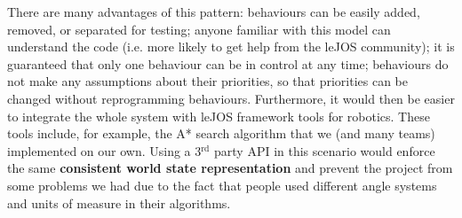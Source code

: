 There are many advantages of this pattern: behaviours can be easily added, removed, or 
separated for testing; anyone familiar with this model can understand the code (i.e. more 
likely to get help from the leJOS community); it is guaranteed that only one behaviour can be 
in control at any time; behaviours do not make any assumptions about their priorities, so that 
priorities can be changed without reprogramming behaviours. Furthermore, it would then be 
easier to integrate the whole system with leJOS framework tools for robotics. These tools 
include, for example, the A* search algorithm that we (and many teams) implemented on our own. 
Using a 3$^{\textrm{rd}}$ party API in this scenario would enforce the same \textbf{consistent 
world state representation} and prevent the project from some problems we had due to the fact 
that people used different angle systems and units of measure in their algorithms.
